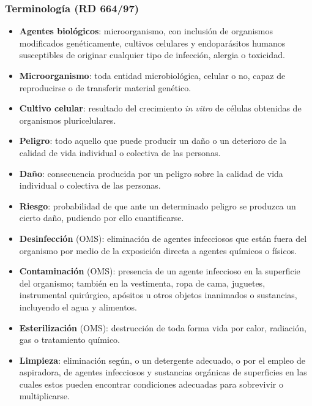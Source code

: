 \subsubsection{Terminología (RD 664/97)}
\begin{itemize}[itemsep=0pt,parsep=0pt,topsep=0pt,partopsep=0pt]
    \item \textbf{Agentes biológicos}: microorganismo, con inclusión de organismos modificados genéticamente, cultivos celulares y endoparásitos humanos susceptibles de originar cualquier tipo de infección, alergia o toxicidad.
    \item\textbf{Microorganismo}: toda entidad microbiológica, celular o no, capaz de reproducirse o de transferir material genético.
    \item\textbf{Cultivo celular}: resultado del crecimiento \textit{in vitro} de células obtenidas de organismos pluricelulares.
    \item\textbf{Peligro}: todo aquello que puede producir un daño o un deterioro de la calidad de vida individual o colectiva de las personas.
    \item\textbf{Daño}: consecuencia producida por un peligro sobre la calidad de vida individual o colectiva de las personas.
    \item\textbf{Riesgo}: probabilidad de que ante un determinado peligro se produzca un cierto daño, pudiendo por ello cuantificarse.
    \item\textbf{Desinfección} (OMS): eliminación de agentes infecciosos que están fuera del organismo por medio de la exposición directa a agentes químicos o físicos.
    \item\textbf{Contaminación} (OMS): presencia de un agente infeccioso en la superficie del organismo; también en la vestimenta, ropa de cama, juguetes, instrumental quirúrgico, apósitos u otros objetos inanimados o sustancias, incluyendo el agua y alimentos.
    \item\textbf{Esterilización} (OMS): destrucción de toda forma vida por calor, radiación, gas o tratamiento químico.
    \item\textbf{Limpieza}: eliminación según, o un detergente adecuado, o por el empleo de aspiradora, de agentes infecciosos y sustancias orgánicas de superficies en las cuales estos pueden encontrar condiciones adecuadas para sobrevivir o multiplicarse.
\end{itemize}
